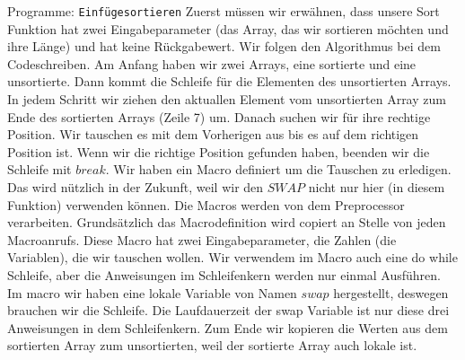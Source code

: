 \begin{myexampleprogram}{ Programme: \texttt{Einfügesortieren}}
Zuerst müssen wir erwähnen, dass unsere Sort Funktion hat zwei Eingabeparameter (das Array, das
wir sortieren möchten und ihre Länge) und hat keine Rückgabewert. Wir folgen den Algorithmus
bei dem Codeschreiben. Am Anfang haben wir zwei Arrays, eine sortierte und eine unsortierte. 
Dann kommt die Schleife für die Elementen des unsortierten Arrays. In jedem Schritt wir ziehen 
den aktuallen Element vom unsortierten Array zum Ende des sortierten Arrays (Zeile 7) um. 
Danach suchen wir für ihre rechtige  Position. Wir tauschen es mit dem Vorherigen aus bis es 
auf dem richtigen Position ist. Wenn wir die richtige Position gefunden haben, beenden wir die 
Schleife mit $break$. Wir haben ein Macro definiert um die Tauschen zu erledigen. Das wird nützlich 
in der Zukunft, weil wir den $SWAP$ nicht nur hier (in diesem Funktion)  verwenden können. 
Die Macros werden von dem Preprocessor verarbeiten. Grundsätzlich das Macrodefinition
wird copiert an Stelle von jeden Macroanrufs. Diese Macro hat zwei Eingabeparameter, die Zahlen (die Variablen), 
die wir tauschen wollen. Wir verwendem im Macro auch eine do while Schleife, aber die Anweisungen 
im Schleifenkern werden nur einmal Ausführen. Im macro wir haben eine lokale Variable von Namen $swap$ hergestellt,
deswegen brauchen wir die Schleife. Die Laufdauerzeit der swap Variable ist nur diese drei Anweisungen in dem 
Schleifenkern. Zum Ende wir kopieren die Werten aus dem sortierten Array zum unsortierten, weil der sortierte 
Array auch lokale ist.


\end{myexampleprogram}
